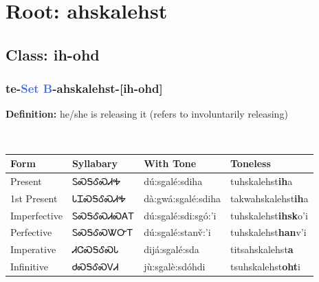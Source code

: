 \needspace{4in}
\section*{Root: ahskalehst}
\nopagebreak
{}
\needspace{3in}
\subsection*{Class: ih-ohd}
\nopagebreak
\needspace{2in}
\subsubsection*{te{-}\textcolor{RoyalBlue}{Set B}{-}\textbf{ahskalehst}{-}[ih-ohd]}
\nopagebreak
\textbf{Definition: } he/she is releasing it (refers to involuntarily releasing)
\\[0.5em]
\begin{tabularx}{\textwidth}{l X X X}%
\toprule%
\textbf{Form}&\textbf{Syllabary}&\textbf{With Tone}&\textbf{Toneless}\\%
\midrule%
Present&ᏚᏍᎦᎴᏍᏗᎭ&dú:sgalé:sdiha&tuhskalehst\textbf{ih}a\\%
1st Present&ᏓᏆᏍᎦᎴᏍᏗᎭ&dà:gwá:sgalé:sdiha&takwahskalehst\textbf{ih}a\\%
Imperfective&ᏚᏍᎦᎴᏍᏗᏍᎪᎢ&dú:sgalé:sdi:sgó:’i&tuhskalehst\textbf{ihsk}o'i\\%
Perfective&ᏚᏍᎦᎴᏍᏔᏅᎢ&dú:sgalé:stanv̌:’i&tuhskalehst\textbf{han}v'i\\%
Imperative&ᏗᏣᏍᎦᎴᏍᏓ&dijá:sgalé:sda&titsahskalehst\textbf{a}\\%
Infinitive&ᏧᏍᎦᎴᏍᏙᏗ&jù:sgalè:sdóhdi&tsuhskalehst\textbf{oht}i\\%
\bottomrule%
\end{tabularx}
\\[1em]